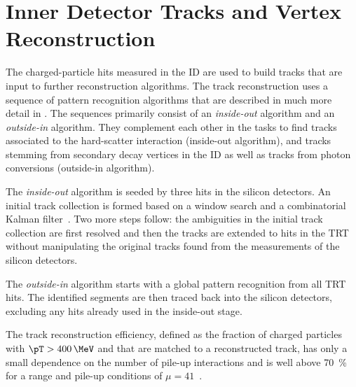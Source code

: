 \section{Inner Detector Tracks and Vertex Reconstruction}
The charged-particle hits measured in the ID are used to build tracks that are input to further reconstruction algorithms. 
The track reconstruction uses a sequence of pattern recognition algorithms that are described in much more detail in . The sequences primarily consist of an \emph{inside-out} algorithm and an \emph{outside-in} algorithm. They complement each other in the tasks to find tracks associated to the hard-scatter interaction (inside-out algorithm), and tracks stemming from secondary decay vertices in the ID as well as tracks from photon conversions (outside-in algorithm).

The \emph{inside-out} algorithm is seeded by three hits in the silicon detectors. An initial track collection is formed based on a window search and a combinatorial Kalman filter~\cite{fruhwirth_application_1987}. Two more steps follow: the ambiguities in the initial track collection are first resolved and then the tracks are extended to hits in the TRT without manipulating the original tracks found from the measurements of the silicon detectors.

The \emph{outside-in} algorithm starts with a global pattern recognition from all TRT hits. The identified segments are then traced back into the silicon detectors, excluding any hits already used in the inside-out stage.

The track reconstruction efficiency, defined as the fraction of charged particles with $\pT > 400\,\MeV$ and  that are matched to a reconstructed track, has only a small dependence on the number of pile-up interactions and is well above \SI{70}{\percent} for a range  and pile-up conditions of $\mu = 41$~\cite{ATLAS-CONF-2012-042}. 

